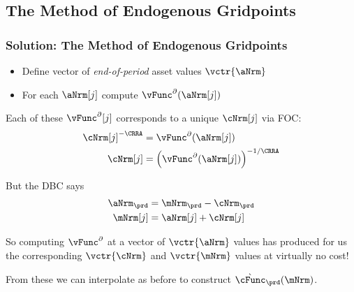 \documentclass{beamer}
\begin{document}
\subsection{The Method of Endogenous Gridpoints}
\begin{frame}
\frametitle{Solution: The Method of Endogenous Gridpoints}

\pause 

\begin{itemize}
\item Define vector of {\it end-of-period} asset values $\vctr{\aNrm}$
\item For each $\aNrm[j]$ compute $\vFunc^{\partial}(\aNrm[j])$
\end{itemize}

\pause 

Each of these $\vFunc^{\partial}[j]$ corresponds to a unique
$\cNrm[j]$ via FOC:
\begin{equation}\begin{gathered}\begin{aligned}
  \cNrm[j]^{-\CRRA}  & = \vFunc^{\partial}(\aNrm[j])
\\ \cNrm[j]  & = \left(\vFunc^{\partial}(\aNrm[j])\right)^{-1/\CRRA}
\end{aligned}\end{gathered}\end{equation}

\pause 

But the DBC says
\begin{equation}\begin{gathered}\begin{aligned}
  \aNrm_{\prd}  & = \mNrm_{\prd} - \cNrm_{\prd}
\\ \mNrm[j]  & = \aNrm[j]+\cNrm[j]
\end{aligned}\end{gathered}\end{equation}

\pause 
So computing $\vFunc^{\partial}$ at a vector of $\vctr{\aNrm}$ values has produced for us the corresponding $\vctr{\cNrm}$ and $\vctr{\mNrm}$ 
values at virtually no cost!  

\pause 
\medskip 
From these we can interpolate as before to construct $\grave{\cFunc}_{\prd}(\mNrm)$.

\end{frame}
\end{document}
